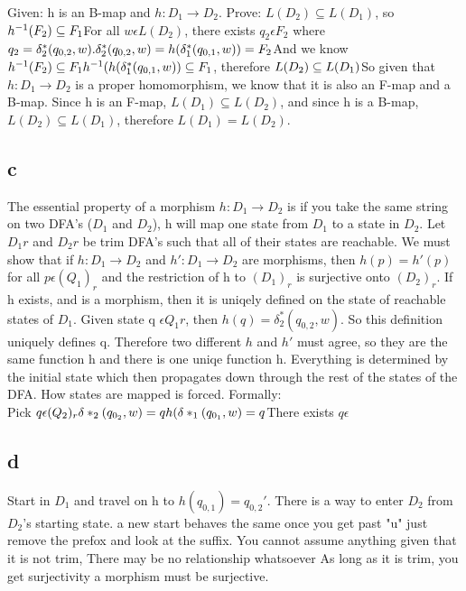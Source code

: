 \documentclass[12pt]{article}
\begin{document}
Given: h is an B-map and $h: D_1 \rightarrow D_2$. Prove: $L(D_2) \subseteq L(D_1)$, so $h^{-1}(F_2) \subseteq F_1 \\
$For all $w \epsilon L(D_2)$, there exists $q_2 \epsilon F_2$ where $q_2 = \delta_2^\ast (q_{0,2} , w). \\
\delta_2^\ast (q_{0,2} , w) =h(\delta_1^\ast (q_{0,1} , w) ) = F_2 \\
$And we know $h^{-1}(F_2) \subseteq F_1 \\
h^{-1}(h(\delta_1^\ast (q_{0,1} , w) ) \subseteq F_1$, therefore $L(D_2) \subseteq L(D_1) \\
$So given that $h: D_1 \rightarrow D_2$ is a proper homomorphism, we know that it is also an F-map and a B-map. Since h is an F-map, $L(D_1) \subseteq L(D_2)$, and since h is a B-map, $L(D_2) \subseteq L(D_1)$, therefore $L(D_1)=L(D_2)$.

\subsection*{c}
The essential property of a morphism $h: D_1 \rightarrow D_2$ is if you take the same string on two DFA's ($D_1$ and $D_2$), h will map one state from $D_1$ to a state in $D_2$. Let $D_1r$ and $D_2r$ be trim DFA's such that all of their states are reachable. We must show that if $h:D_1 \rightarrow D_2$ and $h':D_1 \rightarrow D_2$ are morphisms, then $h(p)=h'(p)$ for all $p \epsilon (Q_1)_r$ and the restriction of h to $(D_1)_r$ is surjective onto $(D_2)_r$.
If h exists, and is a morphism, then it is uniqely defined on the state of reachable states of $D_1$.
Given state q $\epsilon Q_1r$, then $h(q)= \delta_2^\ast (q_{0,2},w)$.
So this definition uniquely defines q.
Therefore two different $h$ and $h'$ must agree, so they are the same function h and there is one uniqe function h.
Everything is determined by the initial state which then propagates down through the rest of the states of the DFA. How states are mapped is forced. Formally: \\
Pick $q \epsilon (Q_2)_r \\
\delta \ast_2 (q_{0_2},w) = q \\
h( \delta \ast_1 (q_{0_1}, w) = q \\
$There exists $q \epsilon$ 

\subsection*{d}
Start in $D_1$ and travel on h to $h(q_{0,1})=q_{0,2}'$.  
There is a way to enter $D_2$ from $D_2$'s starting state.
a new start behaves the same once you get past "u" just remove the prefox and look at the suffix. You cannot assume anything given that it is not trim, There may be no relationship whatsoever
As long as it is trim, you get surjectivity
a morphism must be surjective. 
\end{document}

